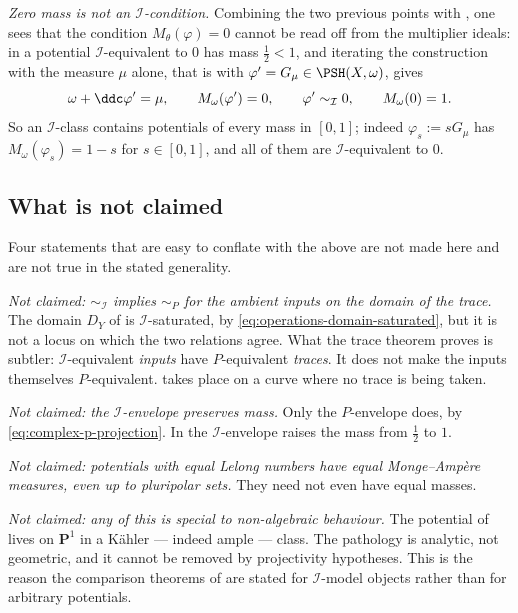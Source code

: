 \emph{Zero mass is not an $\mathcal I$-condition.}  Combining the two
previous points with , one sees that the
condition $M_\theta(\varphi)=0$ cannot be read off from the multiplier
ideals: in  a potential $\mathcal I$-equivalent to
$0$ has mass $\tfrac12<1$, and iterating the construction with the
measure $\mu$ alone, that is with
$\varphi'=G_\mu\in\PSH(X,\omega)$, gives
\[
 \omega+\ddc\varphi'=\mu,
 \qquad
 M_\omega(\varphi')=0,
 \qquad
 \varphi'\sim_{\mathcal I}0,
 \qquad
 M_\omega(0)=1 .
\]
So an $\mathcal I$-class contains potentials of every mass in
$[0,1]$; indeed $\varphi_s:=sG_\mu$ has
$M_\omega(\varphi_s)=1-s$ for $s\in[0,1]$, and all of them are
$\mathcal I$-equivalent to $0$.

\subsection{What is not claimed}
\label{sec:ch51-not-claimed}

Four statements that are easy to conflate with the above are not made
here and are not true in the stated generality.

\emph{Not claimed: $\sim_{\mathcal I}$ implies $\sim_P$ for the
ambient inputs on the domain of the trace.}  The domain $D_Y$ of
 is $\mathcal I$-saturated, by
\eqref{eq:operations-domain-saturated}, but it is not a locus on which
the two relations agree.  What the trace theorem proves is subtler:
$\mathcal I$-equivalent \emph{inputs} have $P$-equivalent
\emph{traces}.  It does not make the inputs themselves $P$-equivalent.
 takes place on a curve where no trace is being taken.

\emph{Not claimed: the $\mathcal I$-envelope preserves mass.}  Only the
$P$-envelope does, by \eqref{eq:complex-p-projection}.  In
 the $\mathcal I$-envelope raises the mass from
$\tfrac12$ to $1$.

\emph{Not claimed: potentials with equal Lelong numbers have equal
Monge--Amp\`ere measures, even up to pluripolar sets.}  They need not even
have equal masses.

\emph{Not claimed: any of this is special to non-algebraic behaviour.}
The potential of  lives on $\mathbf P^1$ in a
K\"ahler --- indeed ample --- class.  The pathology is analytic, not
geometric, and it cannot be removed by projectivity hypotheses.  This is
the reason the comparison theorems of
 are stated for $\mathcal I$-model
objects rather than for arbitrary potentials.

